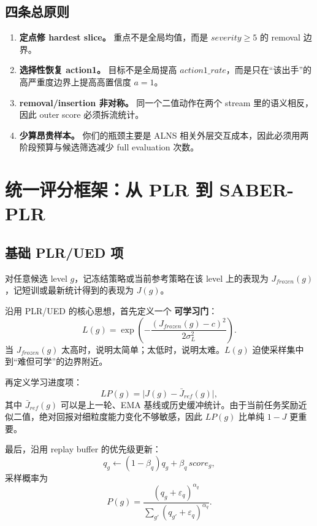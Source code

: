 \documentclass[11pt,a4paper]{ctexart}
\begin{document}
\subsection{四条总原则}
\begin{enumerate}[leftmargin=2.2em,itemsep=0.25em]
    \item \textbf{定点修 hardest slice。} 重点不是全局均值，而是 \(severity\ge 5\) 的 removal 边界。 
    \item \textbf{选择性恢复 action1。} 目标不是全局提高 \(action1\_rate\)，而是只在“该出手”的高严重度边界上提高高置信度 \(a=1\)。
    \item \textbf{removal/insertion 非对称。} 同一个二值动作在两个 stream 里的语义相反，因此 outer score 必须拆流统计。
    \item \textbf{少算昂贵样本。} 你们的瓶颈主要是 ALNS 相关外层交互成本，因此必须用两阶段预算与候选筛选减少 full evaluation 次数。
\end{enumerate}

\section{统一评分框架：从 PLR 到 SABER-PLR}

\subsection{基础 PLR/UED 项}
对任意候选 level \(g\)，记冻结策略或当前参考策略在该 level 上的表现为 \(J_{frozen}(g)\)，记短训或最新统计得到的表现为 \(J(g)\)。

沿用 PLR/UED 的核心思想，首先定义一个 \textbf{可学习门}：
\begin{equation}
L(g)=\exp\left(-\frac{(J_{frozen}(g)-c)^2}{2\sigma_L^2}\right).
\label{eq:learnability}
\end{equation}
当 \(J_{frozen}(g)\) 太高时，说明太简单；太低时，说明太难。\(L(g)\) 迫使采样集中到“难但可学”的边界附近。

再定义学习进度项：
\begin{equation}
LP(g)=\big|J(g)-\bar J_{ref}(g)\big|,
\label{eq:lp}
\end{equation}
其中 \(\bar J_{ref}(g)\) 可以是上一轮、EMA 基线或历史缓冲统计。由于当前任务奖励近似二值，绝对回报对细粒度能力变化不够敏感，因此 \(LP(g)\) 比单纯 \(1-J\) 更重要。

最后，沿用 replay buffer 的优先级更新：
\begin{equation}
q_g \leftarrow (1-\beta_q)q_g + \beta_q\,score_g,
\label{eq:q_update}
\end{equation}
采样概率为
\begin{equation}
P(g)=\frac{(q_g+\varepsilon_q)^{\alpha_q}}{\sum_{g'}(q_{g'}+\varepsilon_q)^{\alpha_q}}.
\label{eq:priority_sampling}
\end{equation}
\end{document}
